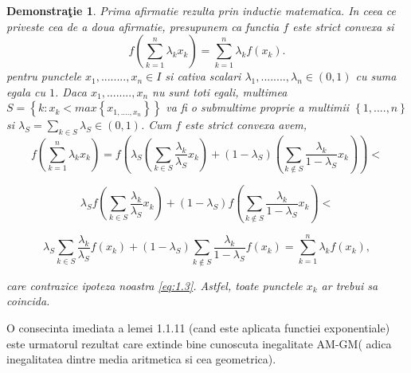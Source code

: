\documentclass[a4paper,12pt,oneside]{report}
\newtheorem{demonstration}{Demonstra\c tie}
\begin{document}
\begin{demonstration}
Prima afirmatie rezulta prin inductie matematica. In ceea ce priveste cea de a doua afirmatie, presupunem ca functia \(f\) este strict convexa si 
\begin{displaymath}
  f\left ( \sum_{k = 1}^{n} \lambda _{k}x_{k}\right )=  \sum_{k = 1}^{n}\lambda _{k}f\left ( x_{k} \right ). \label{eq:1.3} \tag{1.3}
\end{displaymath}
pentru  punctele \(x_{1}, ........, x_{n} \in I\) si cativa scalari \(\lambda _{1}, ........, \lambda _{n} \in \left ( 0 , 1\right )\) cu suma egala cu \(1\). Daca \(x_{1}, ........, x_{n}\) nu sunt toti egali, multimea \(S = \left \{ k: x_{k}<  max \left \{ x_{1,....,x_{n}} \right \} \right \}\) va fi o submultime proprie a multimii  \(\left \{ 1,....,n \right \}\) si \(\lambda _{S} = \sum_{k \in S}^{}\lambda _{S} \in \left ( 0,1 \right )\). Cum \(f\) este strict convexa avem, 
\begin{displaymath}
  f\left ( \sum_{k=1}^{n}\lambda _{k}x_{k} \right ) = f\left ( \lambda _{S}\left ( \sum_{k\in S}^{}\frac{\lambda _{k}}{\lambda _{S}} x_{k}\right ) +\left ( 1-\lambda _{S} \right )\left ( \sum_{k\notin S}^{} \frac{\lambda _{k}}{1 - \lambda _{S}}x_{k}\right )\right ) < 
\end{displaymath}
  
\begin{displaymath}
  \lambda _{S}f\left ( \sum_{k\in S}^{}\frac{\lambda _{k}}{\lambda _{S}} x_{k}\right ) +\left ( 1 - \lambda _{S} \right )f\left ( \sum_{k\notin S}^{}\frac{\lambda _{k}}{1 - \lambda _{S}} x_{k}\right ) < 
\end{displaymath}
  
\begin{displaymath}
  \lambda _{S} \sum_{k\in S}^{}\frac{\lambda _{k}}{\lambda _{S}} f\left ( x_{k} \right ) +\left ( 1 - \lambda _{S} \right ) \sum_{k\notin S}^{}\frac{\lambda _{k}}{1 - \lambda _{S}}f\left ( x_{k} \right )= \sum_{k=1}^{n}\lambda _{k}f\left ( x_{k} \right ),
\end{displaymath}
  

care contrazice ipoteza noastra \ref{eq:1.3}. Astfel, toate punctele \(x_{k}\) ar trebui sa coincida.
\end{demonstration}

O consecinta imediata a lemei 1.1.11 (cand este aplicata functiei exponentiale) este urmatorul rezultat care extinde bine cunoscuta inegalitate AM-GM( adica inegalitatea dintre media aritmetica si cea geometrica).
\end{document}
